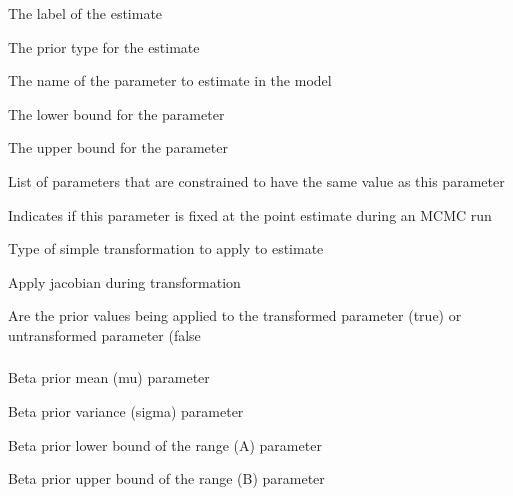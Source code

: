 
 {The label of the estimate}

 {The prior type for the estimate}

 {The name of the parameter to estimate in the model}

 {The lower bound for the parameter}

 {The upper bound for the parameter}

 {List of parameters that are constrained to have the same value as this parameter}

 {Indicates if this parameter is fixed at the point estimate during an MCMC run}

 {Type of simple transformation to apply to estimate}

 {Apply jacobian during transformation}

 {Are the prior values being applied to the transformed parameter (true) or untransformed parameter (false}

\subsubsection[Beta]{}

 {Beta prior  mean (mu) parameter}

 {Beta prior variance (sigma) parameter}

 {Beta prior lower bound of the range (A) parameter}

 {Beta prior upper bound of the range (B) parameter}

\subsubsection[Lognormal]{}

